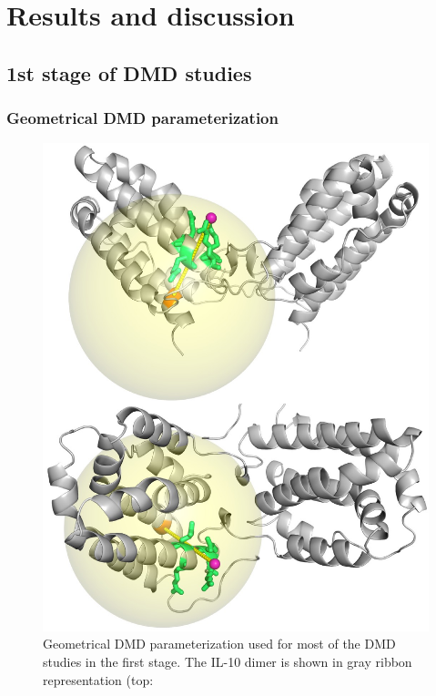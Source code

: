 \section{Results and discussion}
\label{dmdil10:resultsdiscussion}

\subsection{1st stage of DMD studies}

\subsubsection{Geometrical DMD parameterization}
\label{dmdil10:method_geom_setup_1st}

\begin{figure}
\centering
\includegraphics[width=1.0\textwidth]{gfx/dmdil10/round1_il10_ligandcenter_proteincore_sphere_top_and_side_001.jpg}
\caption[]{Geometrical DMD parameterization used for most of the DMD studies
in the first stage. The IL-10 dimer is shown in gray ribbon representation (top:
}
\end{figure}
